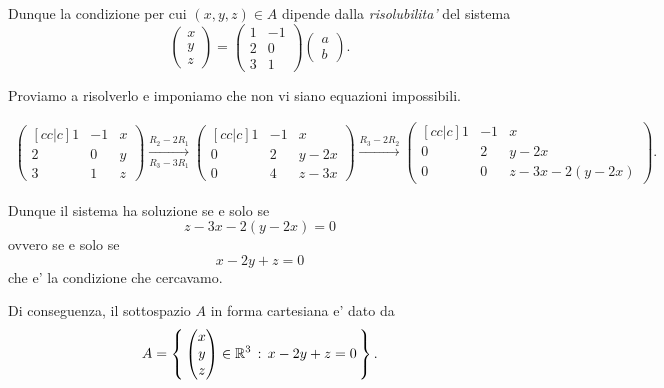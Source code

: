 \begin{example}
    Dunque la condizione per cui $(x, y, z) \in A$ dipende dalla \emph{risolubilita'} del sistema \[
        \begin{pmatrix}
            x \\ y \\ z
        \end{pmatrix} = \begin{pmatrix}
            1 & -1 \\ 2 & 0 \\ 3 & 1
        \end{pmatrix}\begin{pmatrix}
            a \\ b
        \end{pmatrix}.
    \]

    Proviamo a risolverlo e imponiamo che non vi siano equazioni impossibili.

    \begin{align*}
        \begin{pmatrix}[cc|c]
            1 & -1 & x\\ 2 & 0 & y\\ 3 & 1 & z
        \end{pmatrix} \xrightarrow[R_3 - 3R_1]{R_2 - 2R_1}
        \begin{pmatrix}[cc|c]
            1 & -1 & x\\ 0 & 2 & y - 2x\\ 0 & 4 & z - 3x
        \end{pmatrix} \xrightarrow[]{R_3 - 2R_2}
        \begin{pmatrix}[cc|c]
            1 & -1 & x\\ 0 & 2 & y - 2x\\ 0 & 0 & z - 3x - 2(y - 2x)
        \end{pmatrix}.
    \end{align*}

    Dunque il sistema ha soluzione se e solo se \[
        z - 3x - 2(y - 2x) = 0
    \] ovvero se e solo se \[
        x -2y + z = 0
    \] che e' la condizione che cercavamo.

    Di conseguenza, il sottospazio $A$ in forma cartesiana e' dato da \[
        A = \left\{\, \begin{pmatrix}
            x \\ y \\ z
        \end{pmatrix} \in \mathbb{R}^3 \,:\, x - 2y + z = 0\,\right\}.    
    \]
\end{example}

